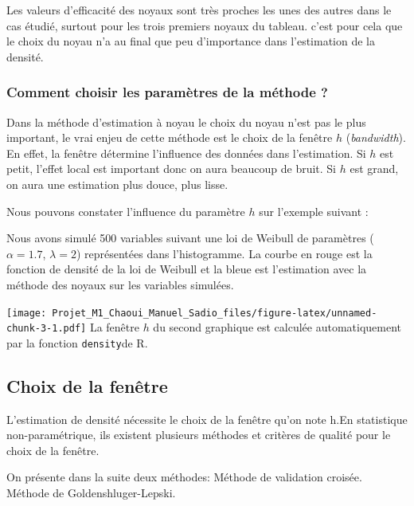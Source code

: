 \documentclass[
]{book}
\begin{document}
\begin{rem}
Les valeurs d'efficacité des noyaux sont très proches les unes des autres dans le cas étudié, surtout pour les trois premiers noyaux du tableau. c'est pour cela que le choix du noyau n'a au final que peu d'importance dans l'estimation de la densité. 
\end{rem}

\hypertarget{comment-choisir-les-paramuxe8tres-de-la-muxe9thode}{%
\subsubsection{Comment choisir les paramètres de la méthode ?}\label{comment-choisir-les-paramuxe8tres-de-la-muxe9thode}}

Dans la méthode d'estimation à noyau le choix du noyau n'est pas le plus important, le vrai enjeu de cette méthode est le choix de la fenêtre \(h\) (\emph{bandwidth}).
En effet, la fenêtre détermine l'influence des données dans l'estimation. Si \(h\) est petit, l'effet local est important donc on aura beaucoup de bruit. Si \(h\) est grand, on aura une estimation plus douce, plus lisse.

Nous pouvons constater l'influence du paramètre \(h\) sur l'exemple suivant :

Nous avons simulé 500 variables suivant une loi de Weibull de paramètres (\(\alpha = 1.7\), \(\lambda=2\)) représentées dans l'histogramme. La courbe en rouge est la fonction de densité de la loi de Weibull et la bleue est l'estimation avec la méthode des noyaux sur les variables simulées.

\texttt{[image: Projet\_M1\_Chaoui\_Manuel\_Sadio\_files/figure-latex/unnamed-chunk-3-1.pdf]}
La fenêtre \(h\) du second graphique est calculée automatiquement par la fonction \texttt{density}de R.

\hypertarget{choix-de-la-fenuxeatre}{%
\subsection{Choix de la fenêtre}\label{choix-de-la-fenuxeatre}}

L'estimation de densité nécessite le choix de la fenêtre qu'on note h.\newline En statistique non-paramétrique, ils existent plusieurs méthodes et critères de qualité pour le choix de la fenêtre.\newline

On présente dans la suite deux méthodes:\newline
\hspace*{0.5cm} Méthode de validation croisée.\newline
\hspace*{0.5cm} Méthode de Goldenshluger-Lepski.\newline
\end{document}

